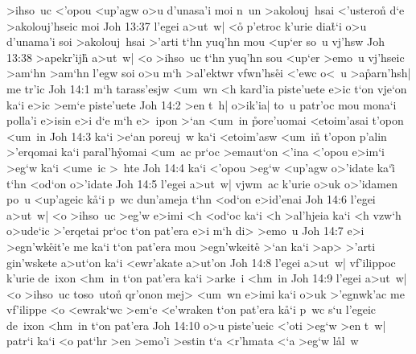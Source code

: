 >ihso~uc
<'opou
<up'agw
o>u
d'unasa'i
moi
n~un
>akolouj~hsai
<'usteron\r{}
d`e
>akolouj'hseic
moi\bibvsend
\vs Joh 13:37
l'egei
a>ut~w|
<o\r{}
p'etroc
k'urie
dia\r{t}`i
o>u
d'unama'i
soi
>akolouj~hsai
>'arti
t`hn
yuq'hn
mou
<up`er
so~u
vj'hsw\bibvsend
\vs Joh 13:38
>apekr'ijh\r{}
a>ut~w|
<o
>ihso~uc
t`hn
yuq'hn
sou
<up`er
>emo~u
vj'hseic
>am`hn
>am`hn
l'egw
soi
o>u
m`h
>al'ektwr
vfwn'hs\r{e}i
<'ewc
o<~u
>a\r{p}arn'hsh|
me
tr'ic\bibvsend
\vs Joh 14:1
m`h
tarass'esjw
<um~wn
<h
kard'ia
piste'uete
e>ic
t`on
vje`on
ka`i
e>ic
>em`e
piste'uete\bibvsend
\vs Joh 14:2
>en
t~h|
o>ik'ia|
to~u
patr'oc
mou
mona`i
polla'i
e>isin
e>i
d`e
m`h
e>~ipon
>`an
<um~in
\r{p}ore'uomai
<etoim'asai
t'opon
<um~in\bibvsend
\vs Joh 14:3
ka`i
>e`an
poreuj~w
ka`i
<etoim'asw
<um~in\r{}
t'opon
p'alin
>'erqomai
ka`i
paral'h\r{y}omai
<um~ac
pr`oc
>emaut`on
<'ina
<'opou
e>im`i
>eg`w
ka`i
<ume~ic
>~hte\bibvsend
\vs Joh 14:4
ka`i
<'opou
>eg`w
<up'agw
o>'idate
ka`i\r{}
t`hn
<od`on
o>'idate\bibvsend
\vs Joh 14:5
l'egei
a>ut~w|
vjwm~ac
k'urie
o>uk
o>'idamen
po~u
<up'ageic
k\r{a}`i
p~wc
dun'ameja
t`hn
<od`on
e>id'enai\bibvsend
\vs Joh 14:6
l'egei
a>ut~w|
<o
>ihso~uc
>eg'w
e>imi
<h
<od`oc
ka`i
<h
>al'hjeia
ka`i
<h
vzw`h
o>ude`ic
>'erqetai
pr`oc
t`on
pat'era
e>i
m`h
di>
>emo~u\bibvsend
\vs Joh 14:7
e>i
>egn'wk\r{e}it'e
me
ka`i
t`on
pat'era
mou
>egn'wkeite\r{}
>`an
ka`i
>ap>
>'arti
gin'wskete
a>ut`on
ka`i
<ewr'akate
a>ut'on\bibvsend
\vs Joh 14:8
l'egei
a>ut~w|
vf'ilippoc
k'urie
de~ixon
<hm~in
t`on
pat'era
ka`i
>arke~i
<hm~in\bibvsend
\vs Joh 14:9
l'egei
a>ut~w|
<o
>ihso~uc
toso~uton\r{}
qr'onon
mej>
<um~wn
e>imi
ka`i
o>uk
>'egnwk'ac
me
vf'ilippe
<o
<ewrak`wc
>em`e
<e'wraken
t`on
pat'era
k\r{a}`i
p~wc
s`u
l'egeic
de~ixon
<hm~in
t`on
pat'era\bibvsend
\vs Joh 14:10
o>u
piste'ueic
<'oti
>eg`w
>en
t~w|
patr`i
ka`i
<o
pat`hr
>en
>emo'i
>estin
t`a
<r'hmata
<`a
>eg`w
l\r{a}l~w

